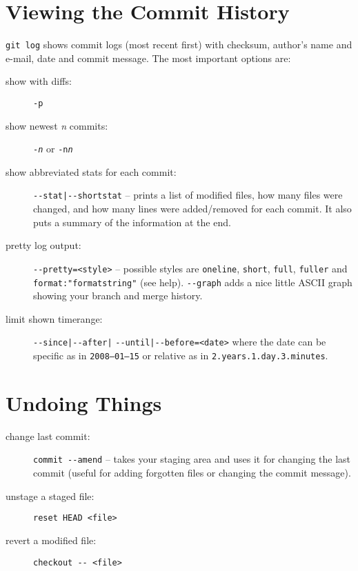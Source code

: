 \documentclass[a4paper,notumble]{leaflet} %
\begin{document}
\section{Viewing the Commit History}
\verb!git log! shows commit logs (most recent first) with checksum, author’s name and e-mail, date and commit message. The most important options are:
\begin{description}
\item[show with diffs:] \verb!-p!
\item[show newest \textit{n} commits:] \texttt{-\textit{n}} or \texttt{-n\textit{n}}
\item[show abbreviated stats for each commit:] \verb!--stat|--shortstat! -- prints a list of modified files, how many files were changed, and how many lines were added/removed for each commit. It also puts a summary of the information at the end.
\item[pretty log output:] \verb!--pretty=<style>! -- possible styles are \verb!oneline!, \verb!short!, \verb!full!, \verb!fuller! and \verb!format:"formatstring"! (see help). \verb!--graph! adds a nice little ASCII graph showing your branch and merge history.
\item[limit shown timerange:] \verb!--since|--after|! \verb!--until|--before=<date>! where the date can be specific as in \verb!2008–01–15! or relative as in \verb!2.years.1.day.3.minutes!.
\end{description}

\section{Undoing Things}
\begin{description}
\item[change last commit:] \verb!commit --amend! -- takes your staging area and uses it for changing the last commit (useful for adding forgotten files or changing the commit message).
\item[unstage a staged file:] \verb!reset HEAD <file>!
\item[revert a modified file:] \verb!checkout -- <file>!
\end{description}
\end{document}
